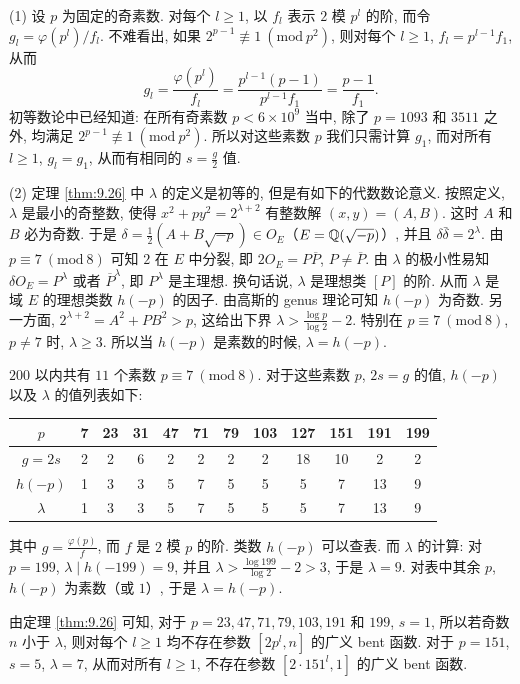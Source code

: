 \begin{remark}
(1) 设 $p$ 为固定的奇素数. 对每个 $l\geqslant 1$, 以 $f_l$ 表示 $2$ 模 $p^l$ 的阶, 而令 $g_l=\varphi(p^l)/f_l$. 不难看出, 如果 $2^{p-1}\not\equiv 1\ (\mathrm{mod}\ p^2)$, 则对每个 $l\geqslant 1$, $f_l=p^{l-1}f_1$, 从而
\[
  g_l=\frac{\varphi(p^l)}{f_l}
  =\frac{p^{l-1}(p-1)}{p^{l-1}f_1}=\frac{p-1}{f_1}.
\]
初等数论中已经知道: 在所有奇素数 $p<6\times 10^9$ 当中, 除了 $p=1093$ 和 $3511$ 之外, 均满足 $2^{p-1}\not\equiv 1\ (\mathrm{mod}\ p^2)$. 所以对这些素数 $p$ 我们只需计算 $g_1$, 而对所有 $l\geqslant 1$, $g_l=g_1$, 从而有相同的 $s=\frac{g}{2}$ 值.

(2) 定理 \ref{thm:9.26} 中 $\lambda$ 的定义是初等的, 但是有如下的代数数论意义. 按照定义, $\lambda$ 是最小的奇整数, 使得 $x^2+py^2=2^{\lambda+2}$ 有整数解 $(x,y)=(A,B)$. 这时 $A$ 和 $B$ 必为奇数. 于是 $\delta=\frac{1}{2}(A+B\sqrt{-p})\in O_E$（$E=\mathbb{Q}(\sqrt{-p})$）, 并且 $\delta\bar{\delta}=2^{\lambda}$. 由 $p\equiv 7\ (\mathrm{mod}\ 8)$ 可知 $2$ 在 $E$ 中分裂, 即 $2O_E=P\overline{P}$, $P\neq\overline{P}$. 由 $\lambda$ 的极小性易知 $\delta O_E=P^{\lambda}$ 或者 $\overline{P}^{\lambda}$, 即 $P^{\lambda}$ 是主理想. 换句话说, $\lambda$ 是理想类 $[P]$ 的阶. 从而 $\lambda$ 是域 $E$ 的理想类数 $h(-p)$ 的因子. 由高斯的 genus 理论可知 $h(-p)$ 为奇数. 另一方面, $2^{\lambda+2}=A^2+PB^2>p$, 这给出下界 $\lambda>\frac{\log p}{\log 2}-2$. 特别在 $p\equiv 7\ (\mathrm{mod}\ 8)$, $p\neq 7$ 时, $\lambda\geqslant 3$. 所以当 $h(-p)$ 是素数的时候, $\lambda=h(-p)$.
\end{remark}

\begin{example}
$200$ 以内共有 $11$ 个素数 $p\equiv 7\ (\mathrm{mod}\ 8)$. 对于这些素数 $p$, $2s=g$ 的值, $h(-p)$ 以及 $\lambda$ 的值列表如下:

\begin{center}
\begin{tabular}{|c|ccccccccccc|}
\hline
$p$ & 7 & 23 & 31 & 47 & 71 & 79 & 103 & 127 & 151 & 191 & 199\\
\hline
$g=2s$ & 2 & 2 & 6 & 2 & 2 & 2 & 2 & 18 & 10 & 2 & 2\\
\hline
$h(-p)$ & 1 & 3 & 3 & 5 & 7 & 5 & 5 & 5 & 7 & 13 & 9\\
\hline
$\lambda$ & 1 & 3 & 3 & 5 & 7 & 5 & 5 & 5 & 7 & 13 & 9\\
\hline
\end{tabular}
\end{center}

其中 $g=\frac{\varphi(p)}{f}$, 而 $f$ 是 $2$ 模 $p$ 的阶. 类数 $h(-p)$ 可以查表. 而 $\lambda$ 的计算: 对 $p=199$, $\lambda\mid h(-199)=9$, 并且 $\lambda>\frac{\log 199}{\log 2}-2>3$, 于是 $\lambda=9$. 对表中其余 $p$, $h(-p)$ 为素数（或 $1$）, 于是 $\lambda=h(-p)$.

由定理 \ref{thm:9.26} 可知, 对于 $p=23,47,71,79,103,191$ 和 $199$, $s=1$, 所以若奇数 $n$ 小于 $\lambda$, 则对每个 $l\geqslant 1$ 均不存在参数 $[2p^l,n]$ 的广义 bent 函数. 对于 $p=151$, $s=5$, $\lambda=7$, 从而对所有 $l\geqslant 1$, 不存在参数 $[2\cdot 151^l,1]$ 的广义 bent 函数.
\end{example}

